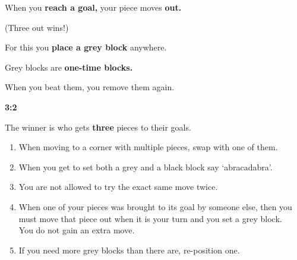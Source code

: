     When you \textbf{reach a goal,} your piece moves \textbf{out. }
    
    (Three out wins!)
    
    For this you \textbf{place a grey block} anywhere.
    
    Grey blocks are \textbf{one-time blocks.}
    
    When you beat them, you remove them again.
    
  

    
    
    \textbf{3:2}
    
        
    The winner is who gets \textbf{three} pieces to their goals.



    \raggedright
    
    

    \begin{enumerate}
        \item When moving to a corner with multiple pieces, swap with one of them.
        \item When you get to set both a grey and a black block say `abracadabra'.
        \item You are not allowed to try the exact same move twice.        
        \item When one of your pieces was brought to its goal by someone else, then you must move that piece out when it is your turn and you set a grey block.\\ You do not gain an extra move.
        \item If you need more grey blocks than there are, re-position one.
    \end{enumerate}

